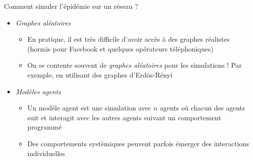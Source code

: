\documentclass[10pt]{beamer}
\begin{document}
\begin{frame}{Comment simuler l'épidémie sur un réseau ?}
  \begin{itemize}
    \item \emph{Graphes aléatoires}
      \begin{itemize}
        \item En pratique, il est très difficile d'avoir accès à des graphes
          réalistes (hormis pour Facebook et quelques opérateurs téléphoniques)
        \item On se contente souvent de \emph{graphes aléatoires} pour les simulations !
          Par exemple, en utilisant des graphes d'Erdös-Rényi
      \end{itemize}
    \item \emph{Modèles agents}
      \begin{itemize}
        \item Un modèle agent est une simulation avec $n$ agents où
          chacun des agents suit et interagit avec les autres agents suivant
          un comportement programmé
        \item Des comportements systèmiques peuvent parfois émerger des interactions
          individuelles
      \end{itemize}
  \end{itemize}

\end{frame}
\end{document}
